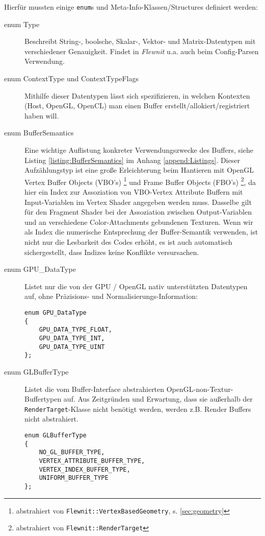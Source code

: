 	Hierfür mussten einige \lstinline|enum|s und Meta-Info-Klassen/Structures definiert werden:
	\begin{description}
		
		\item[enum Type] 
		Beschreibt String-, boolsche, Skalar-, Vektor- und Matrix-Datentypen mit verschiedener 
		Genauigkeit. Findet in \emph{Flewnit} u.a. auch beim Config-Parsen Verwendung.
		
		\item[enum ContextType und ContextTypeFlags] 
		Mithilfe dieser Datentypen lässt sich spezifizieren, in welchen
		Kontexten (Host, OpenGL, OpenCL) man einen Buffer erstellt/allokiert/registriert haben will.
		
		\item[enum BufferSemantics] 
		\label{item:BufferSemantics}
		Eine wichtige Auflistung konkreter Verwendungszwecke des Buffers,
		siehe Listing \ref{listing:BufferSemantics} im Anhang \ref{append:Listings}.
		Dieser Aufzählungstyp ist eine große Erleichterung beim Hantieren mit OpenGL Vertex Buffer Objects (VBO's) 
		\footnote{abstrahiert von \lstinline|Flewnit::VertexBasedGeometry|, s. \ref{sec:geometry} }
		und Frame Buffer Objects (FBO's) 
		\footnote{abstrahiert von \lstinline|Flewnit::RenderTarget|}, 
		da hier ein Index zur Assoziation von VBO-Vertex Attribute Buffern mit Input-Variablen im Vertex Shader
		angegeben werden muss. Dasselbe gilt für den Fragment Shader bei der Assoziation zwischen Output-Variablen 
		und an verschiedene Color-Attachments gebundenen Texturen.
		Wenn wir als Index die numerische Entsprechung der Buffer-Semantik verwenden, 
		ist nicht nur die Lesbarkeit des Codes erhöht, es ist auch automatisch sichergestellt, 
		dass Indizes keine Konflikte versursachen.
		
		\item[enum GPU\_DataType] Listet nur die von der GPU / OpenGL nativ unterstützten Datentypen auf, ohne
		Präzisions- und Normalisierungs-Information:
		\begin{lstlisting}		
enum GPU_DataType
{
	GPU_DATA_TYPE_FLOAT,
	GPU_DATA_TYPE_INT,
	GPU_DATA_TYPE_UINT
};
		\end{lstlisting}
		
		\item[enum GLBufferType]
		Listet die vom Buffer-Interface abstrahierten OpenGL-non-Textur-Buffertypen auf. 
		Aus Zeitgründen und Erwartung, dass sie außerhalb der \lstinline|RenderTarget|-Klasse nicht benötigt werden,
		werden z.B. Render Buffers nicht abstrahiert.
		\begin{lstlisting}		
enum GLBufferType
{
	NO_GL_BUFFER_TYPE,
	VERTEX_ATTRIBUTE_BUFFER_TYPE,
	VERTEX_INDEX_BUFFER_TYPE,
	UNIFORM_BUFFER_TYPE 
};
		\end{lstlisting}	
	

\end{description}
